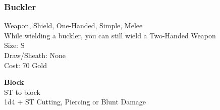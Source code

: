 \subsubsection{Buckler}\label{weapon:buckler}
Weapon, Shield, One-Handed, Simple, Melee\\
While wielding a buckler, you can still wield a Two-Handed Weapon\\
Size: S\\
Draw/Sheath: None\\
Cost: 70 Gold

\textbf{Block}\\
ST to block\\
1d4 + \texttimes ST Cutting, Piercing or Blunt Damage

